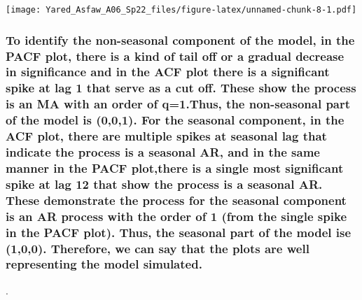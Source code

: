 \documentclass[
]{article}
\begin{document}
\texttt{[image: Yared\_Asfaw\_A06\_Sp22\_files/figure-latex/unnamed-chunk-8-1.pdf]}

\hypertarget{to-identify-the-non-seasonal-component-of-the-model-in-the-pacf-plot-there-is-a-kind-of-tail-off-or-a-gradual-decrease-in-significance-and-in-the-acf-plot-there-is-a-significant-spike-at-lag-1-that-serve-as-a-cut-off.-these-show-the-process-is-an-ma-with-an-order-of-q1.thus-the-non-seasonal-part-of-the-model-is-001.-for-the-seasonal-component-in-the-acf-plot-there-are-multiple-spikes-at-seasonal-lag-that-indicate-the-process-is-a-seasonal-ar-and-in-the-same-manner-in-the-pacf-plotthere-is-a-single-most-significant-spike-at-lag-12-that-show-the-process-is-a-seasonal-ar.-these-demonstrate-the-process-for-the-seasonal-component-is-an-ar-process-with-the-order-of-1-from-the-single-spike-in-the-pacf-plot.-thus-the-seasonal-part-of-the-model-ise-100.-therefore-we-can-say-that-the-plots-are-well-representing-the-model-simulated.}{%
\subsubsection{To identify the non-seasonal component of the model, in
the PACF plot, there is a kind of tail off or a gradual decrease in
significance and in the ACF plot there is a significant spike at lag 1
that serve as a cut off. These show the process is an MA with an order
of q=1.Thus, the non-seasonal part of the model is (0,0,1). For the
seasonal component, in the ACF plot, there are multiple spikes at
seasonal lag that indicate the process is a seasonal AR, and in the same
manner in the PACF plot,there is a single most significant spike at lag
12 that show the process is a seasonal AR. These demonstrate the process
for the seasonal component is an AR process with the order of 1 (from
the single spike in the PACF plot). Thus, the seasonal part of the model
ise (1,0,0). Therefore, we can say that the plots are well representing
the model
simulated.}\label{to-identify-the-non-seasonal-component-of-the-model-in-the-pacf-plot-there-is-a-kind-of-tail-off-or-a-gradual-decrease-in-significance-and-in-the-acf-plot-there-is-a-significant-spike-at-lag-1-that-serve-as-a-cut-off.-these-show-the-process-is-an-ma-with-an-order-of-q1.thus-the-non-seasonal-part-of-the-model-is-001.-for-the-seasonal-component-in-the-acf-plot-there-are-multiple-spikes-at-seasonal-lag-that-indicate-the-process-is-a-seasonal-ar-and-in-the-same-manner-in-the-pacf-plotthere-is-a-single-most-significant-spike-at-lag-12-that-show-the-process-is-a-seasonal-ar.-these-demonstrate-the-process-for-the-seasonal-component-is-an-ar-process-with-the-order-of-1-from-the-single-spike-in-the-pacf-plot.-thus-the-seasonal-part-of-the-model-ise-100.-therefore-we-can-say-that-the-plots-are-well-representing-the-model-simulated.}}

.
\end{document}
